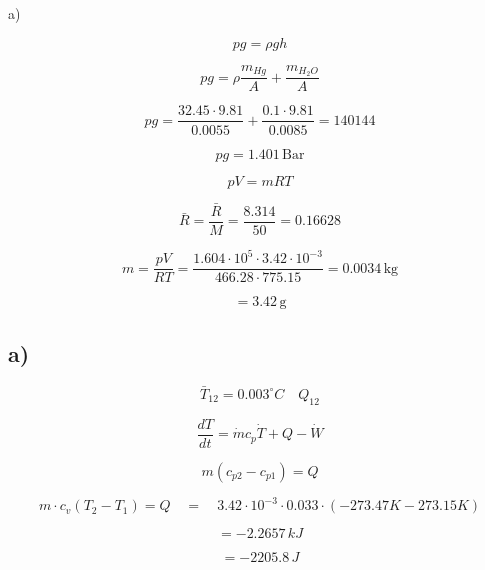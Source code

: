 a)

\[
p g = \rho g h
\]

\[
p g = \rho \frac{m_{Hg}}{A} + \frac{m_{H_2O}}{A}
\]

\[
p g = \frac{32.45 \cdot 9.81}{0.0055} + \frac{0.1 \cdot 9.81}{0.0085} = 140144
\]

\[
p g = 1.401 \, \text{Bar}
\]

\[
p V = m R T
\]

\[
\bar{R} = \frac{\bar{R}}{M} = \frac{8.314}{50} = 0.16628
\]

\[
m = \frac{p V}{R T} = \frac{1.604 \cdot 10^5 \cdot 3.42 \cdot 10^{-3}}{466.28 \cdot 775.15} = 0.0034 \, \text{kg}
\]

\[
= 3.42 \, \text{g}
\]



\subsection*{a)}

\begin{equation*}
\bar{T}_{12} = 0.003^\circ C \quad Q_{12}
\end{equation*}

\begin{equation*}
\frac{dT}{dt} = \dot{m} c_{p} \dot{T} + Q - \dot{W}
\end{equation*}

\begin{equation*}
m(c_{p2} - c_{p1}) = Q
\end{equation*}

\begin{equation*}
m \cdot c_{v} (T_2 - T_1) = Q \quad = \quad 3.42 \cdot 10^{-3} \cdot 0.033 \cdot (-273.47 K - 273.15 K)
\end{equation*}

\begin{equation*}
= -2.2657 \, kJ
\end{equation*}

\begin{equation*}
= -2205.8 \, J
\end{equation*}
